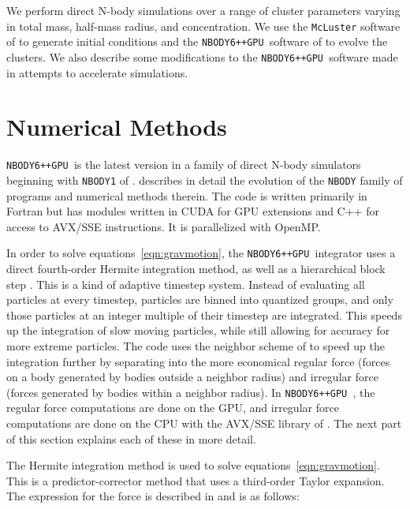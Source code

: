 \documentclass{princeton_astro_thesis}
\newcommand\nbody{\texttt{NBODY6++GPU }}
\numberwithin{equation}{section}
\begin{document}
We perform direct N-body simulations over a range of cluster parameters varying in total mass, half-mass radius, and concentration.  We use the \texttt{McLuster} software of \citet{2011Kupper} to generate initial conditions and the \nbody software of \citet{2015Wang} to evolve the clusters. We also describe some modifications to the \nbody software made in attempts to accelerate simulations.

\section{Numerical Methods}
\nbody is the latest version in a family of direct N-body simulators beginning with \texttt{NBODY1} of \citet{1963Aarseth}. \citet{1999Aarseth} describes in detail the evolution of the \texttt{NBODY} family of programs and numerical methods therein.  The code is written primarily in Fortran but has modules written in CUDA for GPU extensions and C++ for access to AVX/SSE instructions. It is parallelized with OpenMP.

In order to solve equations~\ref{eqn:gravmotion}, the \nbody integrator uses a direct fourth-order Hermite integration method, as well as a hierarchical block step \citep[][and refs within]{2015Wang}. This is a kind of adaptive timestep system. Instead of evaluating all particles at every timestep, particles are binned into quantized groups, and only those particles at an integer multiple of their timestep are integrated. This speeds up the integration of slow moving particles, while still allowing for accuracy for more extreme particles. The code uses the neighbor scheme of \citet{1973Ahmad} to speed up the integration further by separating into the more economical regular force (forces on a body generated by bodies outside a neighbor radius) and irregular force (forces generated by bodies within a neighbor radius). In \nbody, the regular force computations are done on the GPU, and irregular force computations are done on the CPU with the AVX/SSE library of \citet{2012Nitadori}. The next part of this section explains each of these in more detail.

The Hermite integration method is used to solve equations~\ref{eqn:gravmotion}.  This is a predictor-corrector method that uses a third-order Taylor expansion.  The expression for the force is described in \citet{1999Aarseth} and is as follows:
\end{document}
